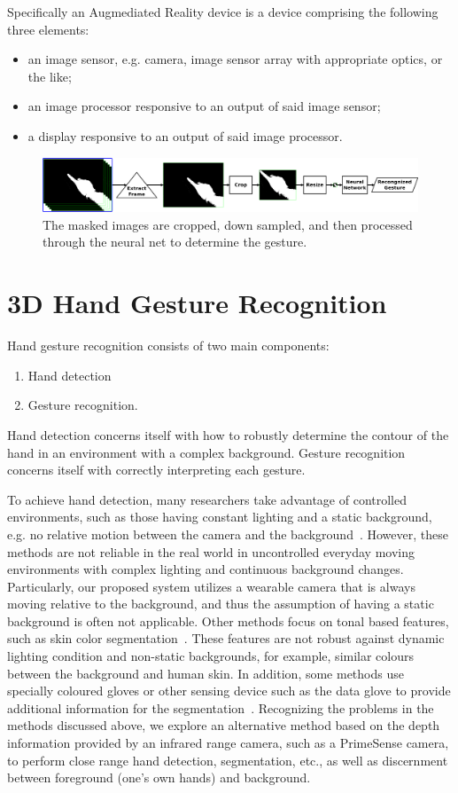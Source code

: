 Specifically an Augmediated Reality device is a device comprising the following three elements:
\begin{itemize}
 \item an image sensor, e.g. camera, image sensor array with appropriate optics,
       or the like;
 \item an image processor responsive to an output of said image sensor;
 \item a display responsive to an output of said image processor.
\end{itemize}

\begin{figure}
\centering
\includegraphics[width=\columnwidth]{ch5/figs/train_flow3.pdf}
\caption{The masked images are cropped, down sampled, and then processed through the neural net to determine the gesture.}
\label{flow_diagram}
\end{figure}

\section{3D Hand Gesture Recognition}
Hand gesture recognition consists of two main components:
\begin{enumerate}
    \item Hand detection
    \item Gesture recognition.
\end{enumerate}
Hand detection concerns itself with how to robustly determine the contour of the hand in an environment with a complex background. Gesture recognition concerns itself with correctly interpreting each gesture.

To achieve hand detection, many researchers take advantage of controlled environments, such as those having constant lighting and a static background, e.g. no relative motion between the camera and the
background~\cite{imagawa1998color, hong2000gesture}. However, these methods are not reliable in the real world in uncontrolled everyday moving environments with complex lighting and continuous
background changes. Particularly, our proposed system utilizes a wearable camera that is always moving relative to the background, and thus the assumption of having a static background is often not applicable. Other methods focus on tonal based features, such as skin color segmentation~\cite{kjeldsen1996toward}. These features are not robust against dynamic lighting condition and non-static backgrounds, for example, similar colours between the background and human skin. In addition, some methods use specially coloured gloves or other sensing device such as the data glove to provide additional information for the segmentation~\cite{sturman1994survey}.
Recognizing the problems in the methods discussed above, we explore an alternative method based on the depth information provided by an infrared range camera, such as a PrimeSense camera, to perform close range hand
detection, segmentation, etc., as well as discernment between foreground (one's own hands) and background.

